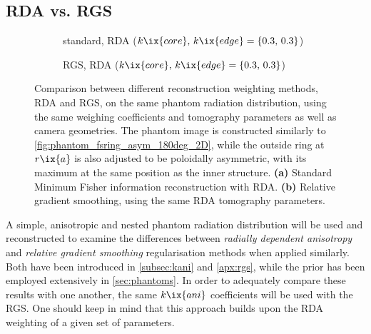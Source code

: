         \subsection{RDA vs. RGS}\label{apx:rdavsrgs}%
%
            \begin{figure}[t]%
                \centering%
                \begin{subfigure}{\textwidth}%
                    \centering%
                    \caption{standard, RDA ($k\ix{core},\,k\ix{edge}=\left\{0.3,\,0.3\right\}$)}%
                \end{subfigure}%
                \newline%
                \begin{subfigure}{\textwidth}%
                    \centering%
                    \caption{RGS, RDA ($k\ix{core},\,k\ix{edge}=\left\{0.3,\,0.3\right\}$)}%
                \end{subfigure}%
                \caption{Comparison between different reconstruction weighting methods, RDA and RGS, on the same phantom radiation distribution, using the same weighing coefficients and tomography parameters as well as camera geometries. The phantom image is constructed similarly to \cref{fig:phantom_fsring_asym_180deg_2D}, while the outside ring at $r\ix{a}$ is also adjusted to be poloidally asymmetric, with its maximum at the same position as the inner structure. \textbf{(a)} Standard Minimum Fisher information reconstruction with RDA. \textbf{(b)} Relative gradient smoothing, using the same RDA tomography parameters.}\label{fig:phantom_fsring_asym_comparison_RGS}%
            \end{figure}%
%
            A simple, anisotropic and nested phantom radiation distribution will be used and reconstructed to examine the differences between \textit{radially dependent anisotropy} and \textit{relative gradient smoothing} regularisation methods when applied similarly. Both have been introduced in \cref{subsec:kani} and \cref{apx:rgs}, while the prior has been employed extensively in \cref{sec:phantoms}. In order to adequately compare these results with one another, the same $k\ix{ani}$ coefficients will be used with the RGS. One should keep in mind that this approach builds upon the RDA weighting of a given set of parameters.\\%
